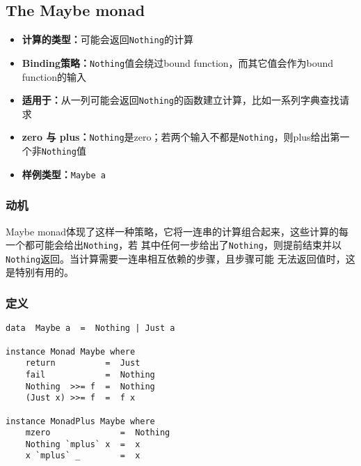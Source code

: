 \subsection{The Maybe monad}
\begin{itemize}[leftmargin=*,topsep=0pt,itemsep=0pt]
\item \textbf{计算的类型：}可能会返回\texttt{Nothing}的计算
\item \textbf{Binding策略：}\texttt{Nothing}值会绕过bound function，而其它值会作为bound function的输入
\item \textbf{适用于：}从一列可能会返回\texttt{Nothing}的函数建立计算，比如一系列字典查找请求
\item \textbf{zero 与 plus：}\texttt{Nothing}是zero；若两个输入不都是\texttt{Nothing}，则plus给出第一个非\texttt{Nothing}值
\item \textbf{样例类型：}\texttt{Maybe a}
\end{itemize}

\subsubsection{动机}
\indent{}Maybe monad体现了这样一种策略，它将一连串的计算组合起来，这些计算的每一个都可能会给出\texttt{Nothing}，若
其中任何一步给出了\texttt{Nothing}，则提前结束并以\texttt{Nothing}返回。当计算需要一连串相互依赖的步骤，且步骤可能
无法返回值时，这是特别有用的。

\vspace{-0.5em}
\subsubsection{定义}
\vspace{-1em}
\begin{verbatim}
data  Maybe a  =  Nothing | Just a

instance Monad Maybe where
    return          =  Just
    fail            =  Nothing
    Nothing  >>= f  =  Nothing
    (Just x) >>= f  =  f x

instance MonadPlus Maybe where
    mzero              =  Nothing
    Nothing `mplus` x  =  x
    x `mplus` _        =  x
\end{verbatim}

\vspace{-0.5em}
